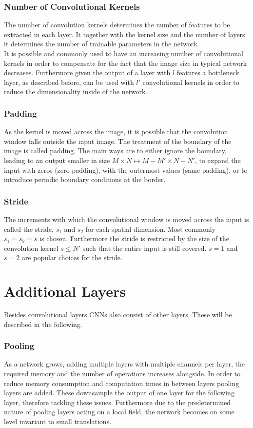 \subsubsection{Number of Convolutional Kernels}
The number of convolution kernels determines the number of features to be extracted in each layer. It together with the kernel size and the number of layers it determines the number of trainable parameters in the network. \\

It is possible and commonly used to have an increasing number of convolutional kernels in order to compensate for the fact that the image size in typical network decreases. Furthermore given the output of a layer with $l$ features a bottleneck layer, as described before, can be used with $l'$ convolutional kernels in order to reduce the dimensionality inside of the network. 


\subsubsection{Padding}
As the kernel is moved across the image, it is possible that the convolution window falls outside the input image. The treatment of the boundary of the image is called padding. The main ways are to either ignore the boundary, leading to an output smaller in size $M\times N \mapsto M-M' \times N-N'$, to expand the input with zeros (zero padding), with the outermost values (same padding), or to introduce periodic boundary conditions at the border.

\subsubsection{Stride}
The increments with which the convolutional window is moved across the input is called the stride, $s_1$ and $s_2$ for each spatial dimension. Most commonly $s_1 = s_2 = s$ is chosen. Furthermore the stride is restricted by the size of the convolution kernel $s\leq N'$ such that the entire input is still covered. $s=1$ and $s=2$ are popular choices for the stride.

\section{Additional Layers}
Besides convolutional layers CNNs also consist of other layers. These will be described in the following.

\subsubsection{Pooling}
As a network grows, adding multiple layers with multiple channels per layer, the required memory and the number of operations increases alongside. In order to reduce memory consumption and computation times in between layers pooling layers are added. These downsample the output of one layer for the following layer, therefore tackling these issues. Furthermore due to the predetermined nature of pooling layers acting on a local field, the network becomes on some level invariant to small translations.

